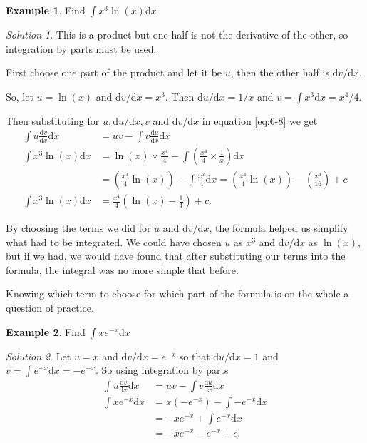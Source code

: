 \documentclass[
  11pt,
  oneside]{book}
\newcommand{\slide}{}
\theoremstyle{definition}
\theoremstyle{definition}
\newtheorem{example}{Example}[chapter]
\theoremstyle{definition}
\theoremstyle{definition}
\theoremstyle{remark}
\newtheorem*{solution}{Solution}
\begin{document}
\slide

\begin{example}
Find \(\displaystyle\int x^3\ln(x)\mathrm{d}x\)
\end{example}

\begin{solution}
This is a product but one half is not the derivative of the other, so integration by parts must be used.

First choose one part of the product and let it be \(u\), then the other half is \(\mathrm{d}v/\mathrm{d}x\).

So, let \(u = \ln(x)\) and \(\mathrm{d}v/\mathrm{d}x = x^3\). Then \(\mathrm{d}u/\mathrm{d}x = 1/x\) and \(v=\displaystyle\int x^3\mathrm{d}x = x^4/4\).

Then substituting for \(u, \mathrm{d}u/\mathrm{d}x, v\) and \(\mathrm{d}v/\mathrm{d}x\) in equation \eqref{eq:6-8} we get
\begin{align*}
\int u\frac{\mathrm{d}v}{\mathrm{d}x}\mathrm{d}x& = uv-\int v\frac{\mathrm{d}u}{\mathrm{d}x}\mathrm{d}x\\
\int x^3\ln(x)\mathrm{d}x& = \ln(x)\times \frac{x^4}{4} - \int\left(\frac{x^4}{4}\times\frac{1}{x}\right)\mathrm{d}x\\
&=\left(\frac{x^4}{4}\ln(x)\right)-\int\frac{x^3}{4}\mathrm{d}x = \left(\frac{x^4}{4}\ln(x)\right) - \left(\frac{x^4}{16}\right)+c\\
\int x^3\ln(x)\mathrm{d}x& = \frac{x^4}{4}\left(\ln(x)-\frac14\right)+c.
\end{align*}
\end{solution}

\slide

By choosing the terms we did for \(u\) and \(\mathrm{d}v/\mathrm{d}x\), the formula helped us simplify what had to be integrated. We could have chosen \(u\) as \(x^3\) and \(\mathrm{d}v/\mathrm{d}x\) as \(\ln(x)\), but if we had, we would have found that after substituting our terms into the formula, the integral was no more simple that before.

Knowing which term to choose for which part of the formula is on the whole a question of practice.

\slide

\begin{example}
Find \(\displaystyle\int xe^{-x}\mathrm{d}x\)
\end{example}

\begin{solution}
Let \(u = x\) and \(\mathrm{d}v/\mathrm{d}x=e^{-x}\) so that \(\mathrm{d}u/\mathrm{d}x = 1\) and \(v=\displaystyle\int e^{-x}\mathrm{d}x = -e^{-x}\). So using integration by parts
\begin{align*}
\int u\frac{\mathrm{d}v}{\mathrm{d}x}\mathrm{d}x& = uv-\int v\frac{\mathrm{d}u}{\mathrm{d}x}\mathrm{d}x\\
\int xe^{-x}\mathrm{d}x&=x(-e^{-x})-\int-e^{-x}\mathrm{d}x\\
&=-xe^{-x}+\int e^{-x}\mathrm{d}x\\
&=-xe^{-x}-e^{-x}+c.
\end{align*}
\end{solution}
\end{document}
